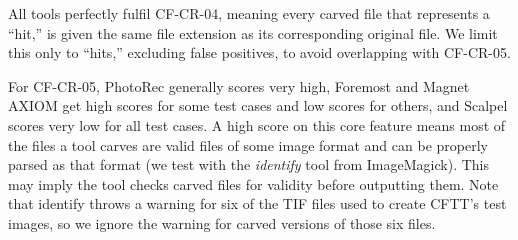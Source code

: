 All tools perfectly fulfil CF-CR-04, meaning every carved file that represents a ``hit,'' is given the same file extension as its corresponding original file.
We limit this only to ``hits,'' excluding false positives, to avoid overlapping with CF-CR-05.

For CF-CR-05, PhotoRec generally scores very high, Foremost and Magnet AXIOM get high scores for some test cases and low scores for others, and Scalpel scores very low for all test cases.
A high score on this core feature means most of the files a tool carves are valid files of some image format and can be properly parsed as that format (we test with the \emph{identify} tool from ImageMagick).
This may imply the tool checks carved files for validity before outputting them.
Note that identify throws a warning for six of the TIF files used to create CFTT's test images, so we ignore the warning for carved versions of those six files.
